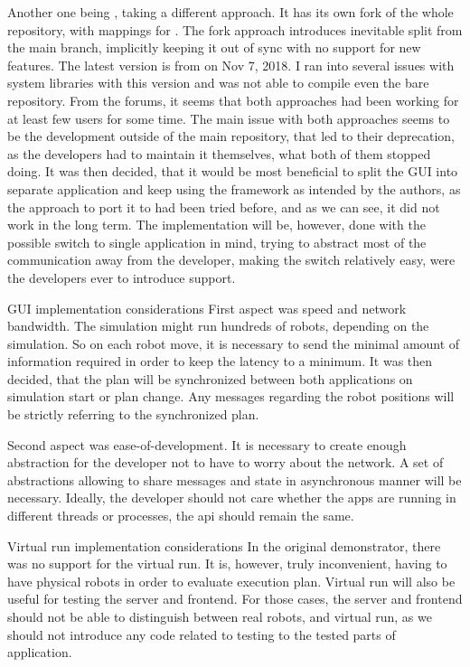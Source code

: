 Another one being {\ofnode}, taking a different approach. It has its own fork of the whole {\of} repository, with mappings for {\cmake}. The fork approach introduces inevitable split from the main branch, implicitly keeping it out of sync with no support for new features. \br
The latest version is from on Nov 7, 2018. I ran into several issues with system libraries with this version and was not able to compile even the bare repository.\br\br
From the forums, it seems that both approaches had been working for at least few users for some time. The main issue with both approaches seems to be the development outside of the main repository, that led to their deprecation, as the developers had to maintain it themselves, what both of them stopped doing.
It was then decided, that it would be most beneficial to split the GUI into separate application and keep using the framework as intended by the authors, as the approach to port it to {\cmake} had been tried before, and as we can see, it did not work in the long term.\br\br
The implementation will be, however, done with the possible switch to single application in mind, trying to abstract most of the communication away from the developer, making the switch relatively easy, were the developers ever to introduce {\cmake} support.

\sec GUI implementation considerations
First aspect was speed and network bandwidth. The simulation might run hundreds of robots, depending on the simulation. So on each robot move, it is necessary to send the minimal amount of information required in order to keep the latency to a minimum. 
It was then decided, that the plan will be synchronized between both applications on simulation start or plan change. Any messages regarding the robot positions will be strictly referring to the synchronized plan.

Second aspect was ease-of-development. It is necessary to create enough abstraction for the developer not to have to worry about the network. A set of abstractions allowing to share messages and state in asynchronous manner will be necessary. Ideally, the developer should not care whether the apps are running in different threads or processes, the api should remain the same.

\sec Virtual run implementation considerations
In the original demonstrator, there was no support for the virtual run. It is, however, truly inconvenient, having to have physical robots in order to evaluate execution plan. Virtual run will also be useful for testing the server and frontend. For those cases, the server and frontend should not be able to distinguish between real robots, and virtual run, as we should not introduce any code related to testing to the tested parts of application.